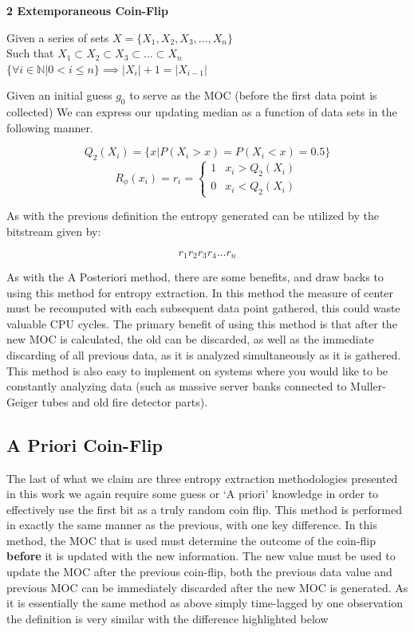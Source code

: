 \documentclass{IEEEtran}
\newenvironment{definition}[1][Definition]{\begin{trivlist}
\item[\hskip \labelsep {\bfseries #1}]}{\end{trivlist}}
\begin{document}
\begin{definition} \textbf{2 Extemporaneous Coin-Flip} \\

\begin{center}
Given a series of sets $X = \{X_1,X_2,X_3,...,X_n\}$ \\ 
Such that $X_1 \subset X_2 \subset X_3 \subset ... \subset X_n$ \\ 
$\{ \forall i \in \mathbb{N} \vert 0 < i \leq n\} \implies \vert X_i\vert + 1 = \vert X_{i-1} \vert $ \\

\end{center} Given an initial guess $g_0$ to serve as the MOC (before the first data point is collected) We can express our updating median as a function of data sets in the following manner.

$$Q_2(X_i) = \{x|P(X_i > x) = P(X_i < x) = 0.5\}$$ 
$$R_\phi(x_i) =  r_i = \begin{cases} 
      1 & x_i > Q_2(X_i) \\
      0 & x_i < Q_2(X_i)
   \end{cases}$$

As with the previous definition the entropy generated can be utilized by the bitstream given by: 

$$r_1r_2r_3r_4...r_n$$
\end{definition} 

As with the A Posteriori method, there are some benefits, and draw backs to using this method for entropy extraction. In this method the measure of center must be recomputed with each subsequent data point gathered, this could waste valuable CPU cycles. The primary benefit of using this method is that after the new MOC is calculated, the old can be discarded, as well as the immediate discarding of all previous data, as it is analyzed simultaneously as it is gathered. This method is also easy to implement on systems where you would like to be constantly analyzing data (such as massive server banks connected to Muller-Geiger tubes and old fire detector parts). 

\subsection{A Priori Coin-Flip}

The last of what we claim are three entropy extraction methodologies presented in this work we again require some guess or `A priori' knowledge in order to effectively use the first bit as a truly random coin flip. This method is performed in exactly the same manner as the previous, with one key difference. In this method, the MOC that is used must determine the outcome of the coin-flip \textbf{before} it is updated with the new information. The new value must be used to update the MOC after the previous coin-flip, both the previous data value and previous MOC can be immediately discarded after the new MOC is generated. As it is essentially the same method as above simply time-lagged by one observation the definition is very similar with the difference highlighted below
\end{document}
